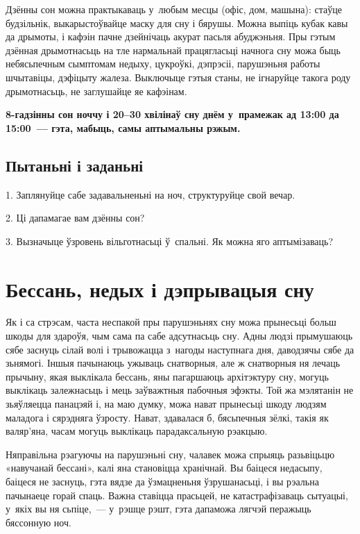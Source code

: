 Дзённы сон можна практыкаваць у~любым месцы (офіс, дом, машына): стаўце будзільнік, выкарыстоўвайце маску для сну і бярушы. Можна выпіць кубак кавы да дрымоты, і кафэін пачне дзейнічаць акурат пасьля абуджэньня. Пры гэтым дзённая дрымотнасьць на тле нармальнай працягласьці начнога сну можа быць небясьпечным сымптомам недыху, цукроўкі, дэпрэсіі, парушэньня работы шчытавіцы, дэфіцыту жалеза. Выключыце гэтыя станы, не ігнаруйце такога роду дрымотнасьць, не заглушайце яе кафэінам.

\textbf{8-гадзінны сон ноччу і 20--30 хвілінаў сну днём у~прамежак ад 13:00 да 15:00~--- гэта, мабыць, самы аптымальны рэжым.}

\subsection*{Пытаньні і заданьні}

1. Заплянуйце сабе задавальненьні на ноч, структуруйце свой вечар.

2. Ці дапамагае вам дзённы сон?

3. Вызначыце ўзровень вільготнасьці ў~спальні. Як можна яго аптымізаваць?


\section{Бессань, недых і дэпрывацыя сну}

Як і са стрэсам, часта неспакой пры парушэньнях сну можа прынесьці больш шкоды для здароўя, чым сама па сабе адсутнасьць сну. Адны людзі прымушаюць сябе заснуць сілай волі і трывожацца з~нагоды наступнага дня, даводзячы сябе да зьнямогі. Іншыя пачынаюць ужываць снатворныя, але ж снатворныя ня лечаць прычыну, якая выклікала бессань, яны пагаршаюць архітэктуру сну, могуць выклікаць залежнасьць і мець заўважтныя пабочныя эфэкты. Той жа мэлятанін не зьяўляецца панацэяй і, на маю думку, можа нават прынесьці шкоду людзям маладога і сярэдняга ўзросту. Нават, здавалася б, бясьпечныя зёлкі, такія як валяр'яна, часам могуць выклікаць парадаксальную рэакцыю.

Няправільна рэагуючы на парушэньні сну, чалавек можа спрыяць разьвіцьцю «навучанай бессані», калі яна становіцца хранічнай. Вы баіцеся недасыпу, баіцеся не заснуць, гэта вядзе да ўзмацненьня ўзрушанасьці, і вы рэальна пачынаеце горай спаць. Важна ставіцца прасьцей, не катастрафізаваць сытуацыі, у~якіх вы ня сьпіце,~--- у~рэшце рэшт, гэта дапаможа лягчэй перажыць бяссонную ноч.


